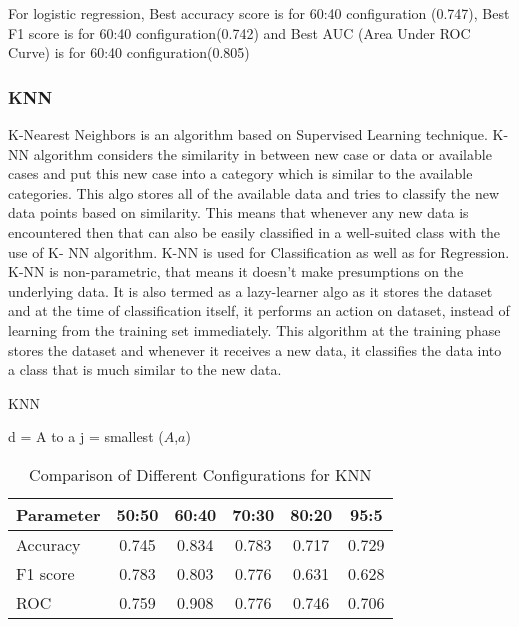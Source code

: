\documentclass{article}
\begin{document}
\bigskip

For logistic regression,
Best accuracy score is for 60:40 configuration (0.747),
Best F1 score is for 60:40 configuration(0.742) and
Best AUC (Area Under ROC Curve) is for 60:40 configuration(0.805)

\newpage
\subsubsection{KNN}

K-Nearest Neighbors is an algorithm based on Supervised Learning technique. K-NN algorithm considers the similarity in between new case or data or available cases and put this new case into a category which is similar to the available categories. This algo stores all of the available data and tries to classify the new data points based on similarity. This means that whenever any new data is encountered then that can also be easily classified in a well-suited class with the use of K- NN algorithm. K-NN is used for Classification as well as for Regression. K-NN is non-parametric, that means it doesn’t make presumptions on the underlying data. It is also termed as a lazy-learner algo as it stores the dataset and at the time of classification itself, it performs an action on dataset, instead of learning from the training set immediately. This algorithm at the training phase stores the dataset and whenever it receives a new data, it classifies the data into a class that is much similar to the new data.

\begin{algorithm}[!h] %
\caption{KNN} %
\label{algo1}
\begin{algorithmic}[1]
\State d = A to a
\EndFor
\State j = {smallest} {($A$,$a$)} 

\EndProcedure
\end{algorithmic}
\end{algorithm}

\begin{table}[!h]
\centering
\begin{tabular}{|l|c|c|c|c|c|}
\hline
\textbf{Parameter} &  \textbf{50:50} &  \textbf{60:40} &  \textbf{70:30} &  \textbf{80:20} &  \textbf{95:5} \\
\hline
Accuracy & 0.745 & 0.834 & 0.783 & 0.717 & 0.729 \\
\hline
F1 score & 0.783 & 0.803 & 0.776 & 0.631 & 0.628\\
\hline
ROC & 0.759 & 0.908 & 0.776 & 0.746 & 0.706\\
\hline


\end{tabular}
\caption{Comparison of Different Configurations for KNN}
\label{tbl:dataset}
\end{table}
\end{document}
